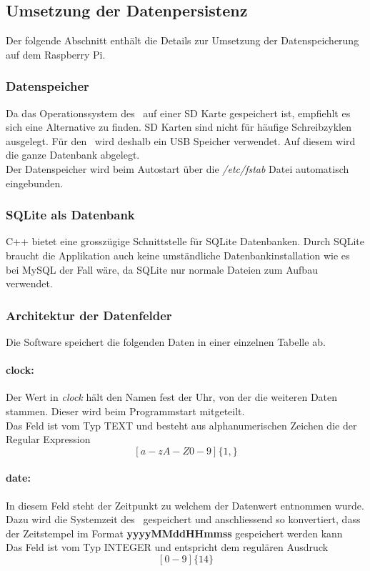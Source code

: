 \subsection{Umsetzung der Datenpersistenz}
    Der folgende Abschnitt enthält die Details zur Umsetzung der Datenspeicherung auf dem Raspberry Pi.
    \subsubsection{Datenspeicher}
    Da das Operationssystem des \rpi\ auf einer SD Karte gespeichert ist, empfiehlt es sich eine Alternative zu finden. SD Karten sind nicht für häufige Schreibzyklen ausgelegt. Für den \documenttitle\ wird deshalb ein USB Speicher verwendet. Auf diesem wird die ganze Datenbank abgelegt.\\
    Der Datenspeicher wird beim Autostart über die \textit{/etc/fstab} Datei automatisch eingebunden.
    
    \subsubsection{SQLite als Datenbank}
    C++ bietet eine grosszügige Schnittstelle für SQLite Datenbanken. Durch SQLite braucht die Applikation auch keine umständliche Datenbankinstallation wie es bei MySQL der Fall wäre, da SQLite nur normale Dateien zum Aufbau verwendet.
    
    \subsubsection{Architektur der Datenfelder}
    Die Software speichert die folgenden Daten in einer einzelnen Tabelle ab.
    \paragraph{clock:}
    Der Wert in \textit{clock} hält den Namen fest der Uhr, von der die weiteren Daten stammen. Dieser wird beim Programmstart mitgeteilt.\\
    Das Feld ist vom Typ TEXT und besteht aus alphanumerischen Zeichen die der Regular Expression $$[a-zA-Z0-9]\{1,\}$$
    \paragraph{date:}\label{sec:db_date}
    In diesem Feld steht der Zeitpunkt zu welchem der Datenwert entnommen wurde. Dazu wird die Systemzeit des \rpi\ gespeichert und anschliessend so konvertiert, dass der Zeitstempel im Format \textbf{yyyyMMddHHmmss} gespeichert werden kann\\
    Das Feld ist vom Typ INTEGER und entspricht dem regulären Ausdruck
    $$[0-9]\{14\}$$
